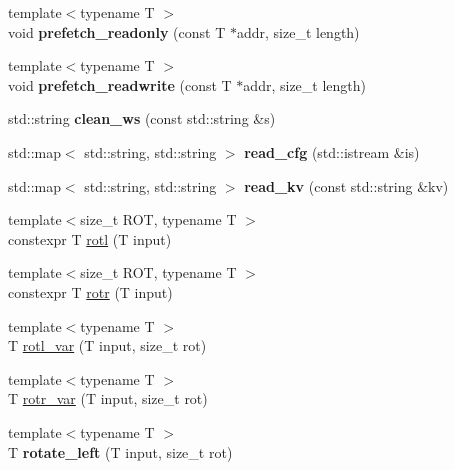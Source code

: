 \begin{DoxyCompactItemize}
{\footnotesize template$<$typename T $>$ }\\void {\bfseries prefetch\+\_\+readonly} (const T $\ast$addr, size\+\_\+t length)
\item 
\mbox{\label{namespace_botan_a9230581f5ab62707c5de29728b2812ad}} 
{\footnotesize template$<$typename T $>$ }\\void {\bfseries prefetch\+\_\+readwrite} (const T $\ast$addr, size\+\_\+t length)
\item 
\mbox{\label{namespace_botan_a79c9e78e8a758e7c4d3c9eec7bd1840e}} 
std\+::string {\bfseries clean\+\_\+ws} (const std\+::string \&s)
\item 
\mbox{\label{namespace_botan_a9fae404a7cc8f1c2b871ec5164924717}} 
std\+::map$<$ std\+::string, std\+::string $>$ {\bfseries read\+\_\+cfg} (std\+::istream \&is)
\item 
\mbox{\label{namespace_botan_a758ab665e39164e5554c7e051dde0a3e}} 
std\+::map$<$ std\+::string, std\+::string $>$ {\bfseries read\+\_\+kv} (const std\+::string \&kv)
\item 
{\footnotesize template$<$size\+\_\+t R\+OT, typename T $>$ }\\constexpr T \mbox{\hyperlink{namespace_botan_a08a31a219cbddcbfcb2f6fc770fcaed4}{rotl}} (T input)
\item 
{\footnotesize template$<$size\+\_\+t R\+OT, typename T $>$ }\\constexpr T \mbox{\hyperlink{namespace_botan_ada30f39e9838317878d9da1e095bdfe8}{rotr}} (T input)
\item 
{\footnotesize template$<$typename T $>$ }\\T \mbox{\hyperlink{namespace_botan_a2e3ac5eb5fe20890242666142e72a8f6}{rotl\+\_\+var}} (T input, size\+\_\+t rot)
\item 
{\footnotesize template$<$typename T $>$ }\\T \mbox{\hyperlink{namespace_botan_ae58d929c7e8f311bc908091212d969dd}{rotr\+\_\+var}} (T input, size\+\_\+t rot)
\item 
\mbox{\label{namespace_botan_a6ad6271f1241d151d1fe3a1af743779c}} 
{\footnotesize template$<$typename T $>$ }\\T {\bfseries rotate\+\_\+left} (T input, size\+\_\+t rot)
\item 

\end{DoxyCompactItemize}
